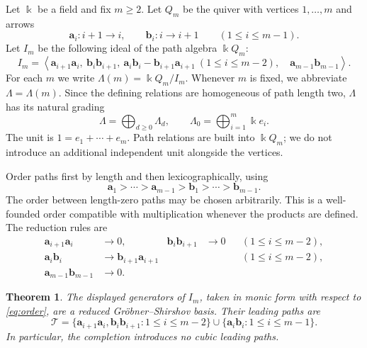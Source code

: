 \documentclass[a4paper,11pt,oneside,reqno]{amsart}
\newtheorem{theorem}{Theorem}[section]
\theoremstyle{definition}
\numberwithin{equation}{section}
\begin{document}
	Let $\Bbbk$ be a field and fix $m\geq2$.  Let $Q_m$ be the quiver
	with vertices $1,\ldots,m$ and arrows
	\[
	\mathbf{a}_i:i+1\longrightarrow i,
	\qquad \mathbf{b}_i:i\longrightarrow i+1
	\qquad(1\leq i\leq m-1).
	\]
	Let $I_m$ be the following ideal of the path algebra $\Bbbk Q_m$:
	\begin{equation}\label{eq:ideal}
		I_m=\left\langle
		\mathbf{a}_{i+1}\mathbf{a}_i,\ \mathbf{b}_i\mathbf{b}_{i+1},\ \mathbf{a}_i\mathbf{b}_i-\mathbf{b}_{i+1}\mathbf{a}_{i+1}
		\ (1\leq i\leq m-2),\quad \mathbf{a}_{m-1}\mathbf{b}_{m-1}
		\right\rangle.
	\end{equation}
	For each $m$ we write $\Lambda(m)=\Bbbk Q_m/I_m$.  Whenever $m$ is
	fixed, we abbreviate $\Lambda=\Lambda(m)$.  Since the defining
	relations are homogeneous of path length two, $\Lambda$ has its natural
	grading
	\[
	\Lambda=\bigoplus_{d\geq0}\Lambda_d,
	\qquad \Lambda_0=\bigoplus_{i=1}^m\Bbbk e_i.
	\]
	The unit is $1=e_1+\cdots+e_m$.  Path relations are built into
	$\Bbbk Q_m$; we do not introduce an additional independent unit
	alongside the vertices.
	
	Order paths first by length and then lexicographically, using
	\begin{equation}\label{eq:order}
		\mathbf{a}_1>\cdots>\mathbf{a}_{m-1}>\mathbf{b}_1>\cdots>\mathbf{b}_{m-1}.
	\end{equation}
	The order between length-zero paths may be chosen arbitrarily.
	This is a well-founded order compatible with multiplication whenever the
	products are defined.  The reduction rules are
	\begin{equation}\label{eq:rules}
		\begin{aligned}
			\mathbf{a}_{i+1}\mathbf{a}_i&\longrightarrow0,&
			\mathbf{b}_i\mathbf{b}_{i+1}&\longrightarrow0
			&&(1\leq i\leq m-2),\\
			\mathbf{a}_i\mathbf{b}_i&\longrightarrow \mathbf{b}_{i+1}\mathbf{a}_{i+1}
			&&&&(1\leq i\leq m-2),\\
			\mathbf{a}_{m-1}\mathbf{b}_{m-1}&\longrightarrow0.
		\end{aligned}
	\end{equation}
	
	\begin{theorem}\label{thm:GS}
		The displayed generators of $I_m$, taken in monic form with respect to
		\eqref{eq:order}, are a reduced Gr\"obner--Shirshov basis.  Their leading
		paths are
		\begin{equation}\label{eq:tips}
			\mathcal T=
			\{\mathbf{a}_{i+1}\mathbf{a}_i,\mathbf{b}_i\mathbf{b}_{i+1}:1\leq i\leq m-2\}
			\cup\{\mathbf{a}_i\mathbf{b}_i:1\leq i\leq m-1\}.
		\end{equation}
		In particular, the completion introduces no cubic leading paths.
	\end{theorem}
	
\end{document}

